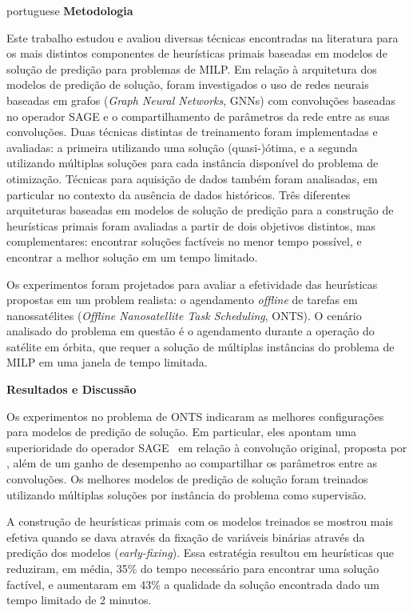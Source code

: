 \begin{resumo}
\begin{otherlanguage*}{portuguese}
\noindent\textbf{\large Metodologia}\newline
{\noindent} 

Este trabalho estudou e avaliou diversas técnicas encontradas na literatura para os mais distintos componentes de heurísticas primais baseadas em modelos de solução de predição para problemas de MILP.
Em relação à arquitetura dos modelos de predição de solução, foram investigados o uso de redes neurais baseadas em grafos (\emph{Graph Neural Networks}, GNNs) com convoluções baseadas no operador SAGE e o compartilhamento de parâmetros da rede entre as suas convoluções.
Duas técnicas distintas de treinamento foram implementadas e avaliadas: a primeira utilizando uma solução (quasi-)ótima, e a segunda utilizando múltiplas soluções para cada instância disponível do problema de otimização.
Técnicas para aquisição de dados também foram analisadas, em particular no contexto da ausência de dados históricos.
Três diferentes arquiteturas baseadas em modelos de solução de predição para a construção de heurísticas primais foram avaliadas a partir de dois objetivos distintos, mas complementares: encontrar soluções factíveis no menor tempo possível, e encontrar a melhor solução em um tempo limitado.

Os experimentos foram projetados para avaliar a efetividade das heurísticas propostas em um problem realista: o agendamento \emph{offline} de tarefas em nanossatélites (\emph{Offline Nanosatellite Task Scheduling}, ONTS).
O cenário analisado do problema em questão é o agendamento durante a operação do satélite em órbita, que requer a solução de múltiplas instâncias do problema de MILP em uma janela de tempo limitada.


\noindent\textbf{\large Resultados e Discussão}\newline

Os experimentos no problema de ONTS indicaram as melhores configurações para modelos de predição de solução.
Em particular, eles apontam uma superioridade do operador SAGE~\cite{hamiltonInductiveRepresentationLearning2017} em relação à convolução original, proposta por , além de um ganho de desempenho ao compartilhar os parâmetros entre as convoluções.
Os melhores modelos de predição de solução foram treinados utilizando múltiplas soluções por instância do problema como supervisão.

A construção de heurísticas primais com os modelos treinados se mostrou mais efetiva quando se dava através da fixação de variáveis binárias através da predição dos modelos (\emph{early-fixing}).
Essa estratégia resultou em heurísticas que reduziram, em média, 35\% do tempo necessário para encontrar uma solução factível, e aumentaram em 43\% a qualidade da solução encontrada dado um tempo limitado de 2 minutos.


\end{otherlanguage*}
\end{resumo}

